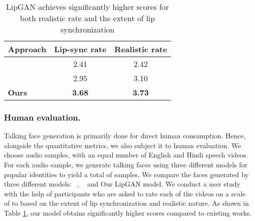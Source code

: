 \documentclass[sigconf]{acmart}
\begin{document}
\begin{table}[h]
  \begin{tabular}{lcc}
    \toprule
    Approach & Lip-sync rate & Realistic rate\\
    \midrule
    \citet{zhou2018talking} & 2.41 & 2.42\\
    \citet{chung2017you} &  2.95 & 3.10\\
    \textbf{Ours} & \textbf{3.68} & \textbf{3.73}\\
  \bottomrule
\end{tabular}
    \caption{LipGAN achieves significantly higher scores for both realistic rate and the extent of lip synchronization}
    \label{tab:lip_res}
    \vspace{-0.7cm}
\end{table}




\subsubsection{Human evaluation.}Talking face generation is primarily done for direct human consumption. Hence, alongside the quantitative metrics, we also subject it to human evaluation. We choose  audio samples, with an equal number of English and Hindi speech videos. For each audio sample, we generate talking faces using three different models for  popular identities to yield a total of  samples. We compare the faces generated by three different models:  ~\citet{chung2017you},  ~\citet{zhou2018talking} and  Our LipGAN model. We conduct a user study with the help of  participants who are asked to rate each of the videos on a scale of  to  based on the extent of lip synchronization and realistic nature. As shown in Table \ref{tab:lip_res}, our model obtains significantly higher scores compared to existing works.
\end{document}
